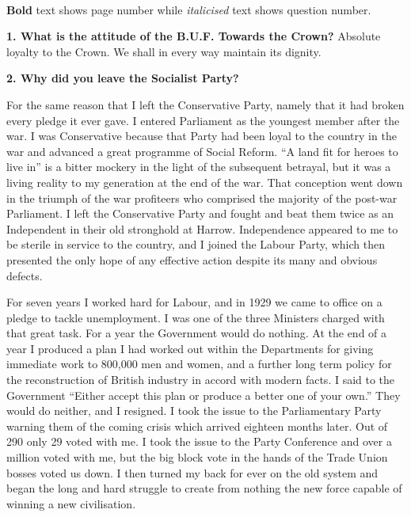 \documentclass{book}
\begin{document}
 \\
\textbf{Bold} text shows page number while \textit{italicised} text shows question number.
\newpage
{}
\pagestyle{plain}
\pagecolor{white}
\color{black}
\begin{flushright}
\textbf{1. What is the attitude of the B.U.F. Towards the Crown?}
Absolute loyalty to the Crown. We shall in every way maintain its
dignity.
\end{flushright}
\begin{flushleft}
\textbf{2. Why did you leave the Socialist Party?}

For the same reason that I left the Conservative Party, namely that it had broken every pledge it
ever gave. I entered Parliament as the youngest member after the war. I was Conservative
because that Party had been loyal to the country in the war and advanced a great programme of
Social Reform. ``A land fit for heroes to live in'' is a bitter mockery in the light of the subsequent
betrayal, but it was a living reality to my generation at the end of the war. That conception went
down in the triumph of the war profiteers who comprised the majority of the post-war Parliament.
I left the Conservative Party and fought and beat them twice as an Independent in their old
stronghold at Harrow. Independence appeared to me to be sterile in service to the country, and I
joined the Labour Party, which then presented the only hope of any effective action despite its
many and obvious defects.

For seven years I worked hard for Labour, and in 1929 we came to office on a pledge to tackle
unemployment. I was one of the three Ministers charged with that great task. For a year the
Government would do nothing. At the end of a year I produced a plan I had worked out within
the Departments for giving immediate work to 800,000 men and women, and a further long term
policy for the reconstruction of British industry in accord with modern facts. I said to the
Government ``Either accept this plan or produce a better one of your own.'' They would do
neither, and I resigned. I took the issue to the Parliamentary Party warning them of the coming
crisis which arrived eighteen months later. Out of 290 only 29 voted with me. I took the issue to
the Party Conference and over a million voted with me, but the big block vote in the hands of the
Trade Union bosses voted us down. I then turned my back for ever on the old system and began
the long and hard struggle to create from nothing the new force capable of winning a new
civilisation.


\end{flushleft}
\end{document}
